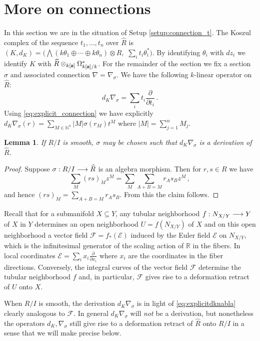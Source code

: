 \documentclass[english,letter paper,12pt,leqno]{article}
\newtheorem{lemma}[theorem]{Lemma}
\theoremstyle{example}
\numberwithin{equation}{section}
\def\be{\begin{equation}}
\def\ee{\end{equation}}
\begin{document}
\section{More on connections}

In this section we are in the situation of Setup \ref{setup:connection_t}. The Koszul complex of the sequence $t_1,\ldots,t_n$ over $\widehat{R}$ is $(K, d_K) = \Big( \bigwedge( k \theta_1 \oplus \cdots \oplus k \theta_n ) \otimes \widehat{R}, \,\,\sum_i t_i \theta_i^* \Big)$. By identifying $\theta_i$ with $dz_i$ we identify $K$ with $\widehat{R} \otimes_{k[\bold{z}]} \Omega^*_{k[\bold{z}]/k}$. For the remainder of the section we fix a section $\sigma$ and associated connection $\nabla = \nabla_\sigma$. We have the following $k$-linear operator on $\widehat{R}$:
\be\label{eq:explicitdknabla}
d_K \nabla_\sigma = \sum_i t_i \frac{\partial}{\partial t_i}\,.
\ee
Using \eqref{eq:explicit_connection} we have explicitly $d_K \nabla_\sigma(r) = \sum_{M \in \mathbb{N}^n} |M| \sigma(r_M) t^M$ where $|M| = \sum_{j=1}^n M_j$.

\begin{lemma} If $R/I$ is smooth, $\sigma$ may be chosen such that $d_K \nabla_\sigma$ is a derivation of $\widehat{R}$.
\end{lemma}
\begin{proof}
Suppose $\sigma: R/I \longrightarrow \widehat{R}$ is an algebra morphism. Then for $r,s \in R$ we have
\[
\sum_M (rs)_M z^M = \sum_M \sum_{A + B = M} r_As_B z^M\,,
\]
and hence $(rs)_M = \sum_{A+B = M} r_A s_B$. From this the claim follows.
\end{proof}

Recall that for a submanifold $X \subseteq Y$, any tubular neighborhood $f: N_{X/Y} \longrightarrow Y$ of $X$ in $Y$ determines an open neighborhood $U = f(N_{X/Y})$ of $X$ and on this open neighborhood a vector field $\mathscr{F} = f_*(\mathscr{E})$ induced by the Euler field $\mathscr{E}$ on $N_{X/Y}$, which is the infinitesimal generator of the scaling action of $\mathbb{R}$ in the fibers. In local coordinates $\mathscr{E} = \sum_i x_i \frac{\partial}{\partial x_i}$ where $x_i$ are the coordinates in the fiber directions. Conversely, the integral curves of the vector field $\mathscr{F}$ determine the tubular neighborhood $f$ \cite[\S 2.3]{burs} and, in particular, $\mathscr{F}$ gives rise to a deformation retract of $U$ onto $X$.

When $R/I$ is smooth, the derivation $d_K \nabla_\sigma$ is in light of \eqref{eq:explicitdknabla} clearly analogous to $\mathscr{F}$. In general $d_K \nabla_\sigma$ will \emph{not} be a derivation, but nonetheless the operators $d_K, \nabla_\sigma$ still give rise to a deformation retract of $\widehat{R}$ onto $R/I$ in a sense that we will make precise below.
\end{document}
